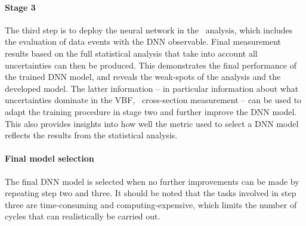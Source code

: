 \paragraph{Stage 3}
The third step is to deploy the neural network in the \HWW\ analysis, which includes the evaluation of data events with the DNN observable. Final measurement results based on the full statistical analysis that take into account all uncertainties can then be produced. This demonstrates the final performance of the trained DNN model, and reveals the weak-spots of the analysis and the developed model.
The latter information -- in particular information about what uncertainties dominate in the VBF, \HWW\ cross-section measurement -- can be used to adapt the training procedure in stage two and further improve the DNN model.
This also provides insights into how well the metric used to select a DNN model reflects the results from the statistical analysis.

\paragraph{Final model selection}
The final DNN model is selected when no further improvements can be made by repeating step two and three. It should be noted that the tasks involved in step three are time-consuming and computing-expensive, which limits the number of cycles that can realistically be carried out.




